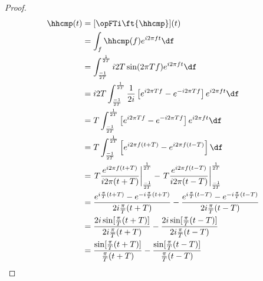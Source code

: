 \begin{proof}
\begin{align*}
   \hhcmp(t)
     &= [\opFTi\ft{\hhcmp}](t)
   \\&= \int_f \hhcmp(f) e^{i2\pi ft} \df
   \\&= \int_\frac{-1}{2T}^\frac{1}{2T}
        i2T \sin(2\pi Tf) e^{i2\pi ft} \df
   \\&= i2T\int_\frac{-1}{2T}^\frac{1}{2T}
        \frac{1}{2i}\left[ e^{i2\pi Tf} - e^{-i2\pi Tf}  \right]
        e^{i2\pi ft} \df
   \\&= T\int_\frac{-1}{2T}^\frac{1}{2T}
        \left[ e^{i2\pi Tf} - e^{-i2\pi Tf}  \right]
        e^{i2\pi ft} \df
   \\&= T\int_\frac{-1}{2T}^\frac{1}{2T}
        \left[ e^{i2\pi f(t+T)} - e^{i2\pi f(t-T)}  \right]
        \df
   \\&= \left. T\frac{e^{i2\pi f(t+T)}}{i2\pi (t+T)} \right|_\frac{-1}{2T}^\frac{1}{2T}  -
        \left. T\frac{e^{i2\pi f(t-T)}}{i2\pi (t-T)} \right|_\frac{-1}{2T}^\frac{1}{2T}
   \\&= \frac{e^{i\frac{\pi}{T} (t+T)} - e^{-i\frac{\pi}{T} (t+T)}}{2i\frac{\pi}{T} (t+T)}   -
        \frac{e^{i\frac{\pi}{T} (t-T)} - e^{-i\frac{\pi}{T} (t-T)}}{2i\frac{\pi}{T} (t-T)}
   \\&= \frac{2i\sin[\frac{\pi}{T}(t+T)]} {2i\frac{\pi}{T} (t+T)}   -
        \frac{2i\sin[\frac{\pi}{T}(t-T)]} {2i\frac{\pi}{T} (t-T)}
   \\&= \frac{\sin[\frac{\pi}{T}(t+T)]} {\frac{\pi}{T} (t+T)}   -
        \frac{\sin[\frac{\pi}{T}(t-T)]} {\frac{\pi}{T} (t-T)}
\end{align*}
\end{proof}


